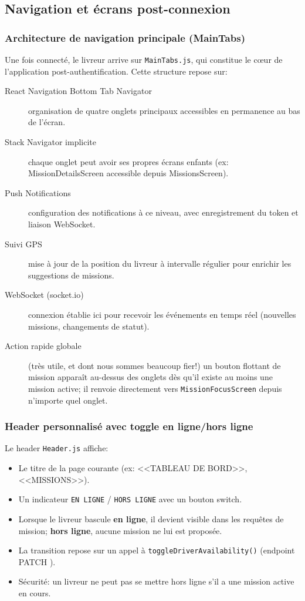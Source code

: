 \newpage
\subsection{Navigation et écrans post-connexion}

\subsubsection{Architecture de navigation principale (MainTabs)}

Une fois connecté, le livreur arrive sur \texttt{MainTabs.js}, qui constitue le cœur de l'application post-authentification. Cette structure repose sur:

\begin{description}
    \item[React Navigation Bottom Tab Navigator] organisation de quatre onglets principaux accessibles en permanence au bas de l'écran.
    \item[Stack Navigator implicite] chaque onglet peut avoir ses propres écrans enfants (ex: MissionDetailsScreen accessible depuis MissionsScreen).
    \item[Push Notifications] configuration des notifications à ce niveau, avec enregistrement du token et liaison WebSocket.
    \item[Suivi GPS] mise à jour de la position du livreur à intervalle régulier pour enrichir les suggestions de missions.
    \item[WebSocket (socket.io)] connexion établie ici pour recevoir les événements en temps réel (nouvelles missions, changements de statut).
    \item[Action rapide globale] (très utile, et dont nous sommes beaucoup fier!) un bouton flottant de mission apparaît au-dessus des onglets dès qu'il existe au moins une mission active; il renvoie directement vers \texttt{MissionFocusScreen} depuis n'importe quel onglet.
\end{description}

\subsubsection{Header personnalisé avec toggle en ligne/hors ligne}

Le header \texttt{Header.js} affiche:
\begin{itemize}
    \item Le titre de la page courante (ex: <<TABLEAU DE BORD>>, <<MISSIONS>>).
    \item Un indicateur \texttt{EN LIGNE} / \texttt{HORS LIGNE} avec un bouton switch.
    \item Lorsque le livreur bascule \textbf{en ligne}, il devient visible dans les requêtes de mission; \textbf{hors ligne}, aucune mission ne lui est proposée.
    \item La transition repose sur un appel à \texttt{toggleDriverAvailability()} (endpoint PATCH ).
    \item Sécurité: un livreur ne peut pas se mettre hors ligne s'il a une mission active en cours.
\end{itemize}

